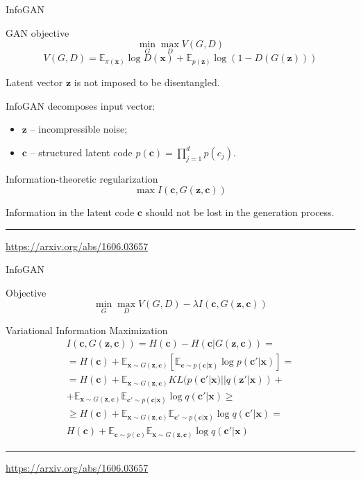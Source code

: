 \documentclass{beamer}
\newcommand{\bc}{\mathbf{c}}
\newcommand{\bx}{\mathbf{x}}
\newcommand{\bz}{\mathbf{z}}
\newcommand{\bbE}{\mathbb{E}}
\begin{document}
\begin{frame}{InfoGAN}
	\begin{block}{GAN objective}
		\vspace{-0.3cm}
		\[
		\min_{G} \max_D V(G, D)
		\]
		\[
		V(G, D)  =  \bbE_{\pi(\bx)} \log D(\bx) + \bbE_{p(\bz)} \log (1 - D(G(\bz)))
		\]
	\end{block}
	Latent vector $\bz$ is not imposed to be disentangled.
	
	InfoGAN decomposes input vector:
	\begin{itemize}
		\item $\bz$ -- incompressible noise;
		\item $\bc$ -- structured latent code $p(\bc) = \prod_{j=1}^d p(c_j)$.
	\end{itemize}
	\begin{block}{Information-theoretic regularization}
		\vspace{-0.3cm}
		\[
			\max I (\bc, G(\bz, \bc))
		\]
	\end{block}
	Information in the latent code $\bc$ should not be lost in the generation process.
	\vfill
	\hrule\medskip
	{\scriptsize \href{https://arxiv.org/abs/1606.03657}{https://arxiv.org/abs/1606.03657}}
\end{frame}
\begin{frame}{InfoGAN}
	\begin{block}{Objective}
		\vspace{-0.3cm}
		\[
		\min_{G} \max_D V(G, D) - \lambda I (\bc, G(\bz, \bc))
		\]
	\end{block}
	\begin{block}{Variational Information Maximization}
		\vspace{-0.3cm}
		\begin{multline*}
		I (\bc, G(\bz, \bc)) = H(\bc) - H(\bc | G(\bz, \bc)) = \\
		= H(\bc) + \bbE_{\bx \sim G(\bz, \bc)} \left[ \bbE_{\bc \sim p(\bc | \bx)} \log p(\bc' | \bx) \right] = \\ 
		= H(\bc) + \bbE_{\bx \sim G(\bz, \bc)} KL(p(\bc'| \bx) || q(\bz' | \bx)) + 
		\\ + \bbE_{\bx \sim G(\bz, \bc)}  \bbE_{\bc' \sim p(\bc | \bx)} \log q(\bc' | \bx)  \geq\\
		 \geq H(\bc) + \bbE_{\bx \sim G(\bz, \bc)} \bbE_{\bc' \sim p(\bc | \bx)} \log q(\bc' | \bx) = \\
		 H(\bc) + \bbE_{\bc \sim p(\bc)} \bbE_{\bx \sim G(\bz, \bc)} \log q(\bc' | \bx)
		\end{multline*}
	\end{block}
	\vfill
	\hrule\medskip
	{\scriptsize \href{https://arxiv.org/abs/1606.03657}{https://arxiv.org/abs/1606.03657}}
\end{frame}
\end{document}
